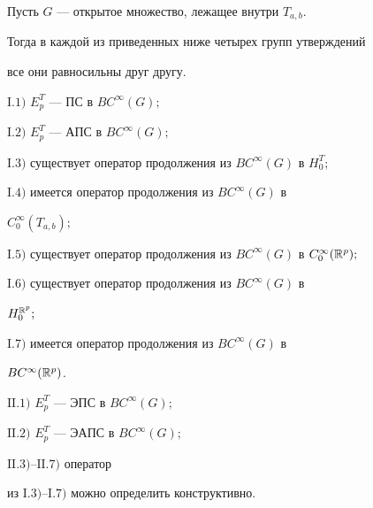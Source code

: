 \begin{thm}


Пусть $G$ --- открытое множество, лежащее внутри $T_{a,b}$.


Тогда в каждой из приведенных ниже четырех групп утверждений 


все они равносильны друг другу.





$\mathrm{I}.1)$ $E^T_p$ --- ПС в $BC^\infty(G);$





$\mathrm{I}.2)$ $E^T_p$ --- АПС в $BC^\infty(G);$





$\mathrm{I}.3)$ существует оператор продолжения из $BC^\infty(G)$ в $H_0^T;$





$\mathrm{I}.4)$ имеется оператор продолжения из $BC^{\infty}(G)$ в


$C_0^\infty(T_{a,b});$





$\mathrm{I}.5)$ существует оператор продолжения из $BC^\infty(G)$ в $C_0^{\infty}


(\Bbb{R}^p);$





$\mathrm{I}.6)$ существует оператор продолжения из $BC^{\infty}(G)$ в


$H_0^{\Bbb{R}^p};$





$\mathrm{I}.7)$ имеется оператор продолжения из $BC^\infty(G)$ в


$BC^\infty(\Bbb{R}^p)$.


\smallskip





$\mathrm{II}.1)$ $E^T_p$ --- ЭПС в $BC^\infty(G);$





$\mathrm{II}.2)$ $E^T_p$ --- ЭАПС в $BC^\infty(G);$





$\mathrm{II}.3)$--$\mathrm{II}.7)$ оператор


из $\mathrm{I}.3)$--$\mathrm{I}.7)$ можно определить конструктивно.



\end{thm}
